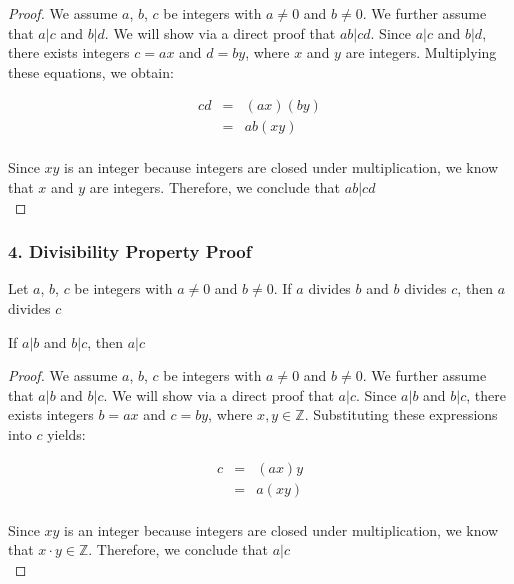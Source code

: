 \begin{proof}
We assume $a$, $b$, $c$ be integers with $a \neq 0$ and $b\neq 0$. We further assume that $a | c$ and $b | d$. We will show via a direct proof that $ab | cd$. Since $a | c$ and $b | d$, there exists integers $c = ax$ and $d = by$, where $x$ and $y$ are integers. Multiplying these equations, we obtain: 

\begin{eqnarray*}
	cd & = & (ax)(by) \nonumber \\	
	& = & ab(xy) \nonumber \\
\end{eqnarray*}

Since $xy$ is an integer because integers are closed under multiplication, we know that $x$ and $y$ are integers. Therefore, we conclude that $ab | cd$ \\
\end{proof}


\subsubsection*{4. Divisibility Property Proof}

Let $a$, $b$, $c$ be integers with $a \neq 0$ and $b\neq 0$. If $a$ divides $b$ and $b$ divides $c$, then $a$ divides $c$

\begin{tcolorbox}
	\begin{theorem}
		If $a | b$ and $b | c$, then $a | c$
	\end{theorem}
\end{tcolorbox}

\begin{proof}
We assume $a$, $b$, $c$ be integers with $a \neq 0$ and $b\neq 0$. We further assume that $a | b$ and $b | c$. We will show via a direct proof that $a | c$. Since $a | b$ and $b | c$, there exists integers $b = ax$ and $c = by$, where $x, y \in \mathbb{Z}$. Substituting these expressions into $c$ yields:

\begin{eqnarray*}	
	c & = & (ax)y \nonumber \\
	& = & a(xy) \nonumber \\
\end{eqnarray*}

Since $xy$ is an integer because integers are closed under multiplication, we know that $x \cdot y \in \mathbb{Z}$. Therefore, we conclude that $a | c$ \\
\end{proof}




